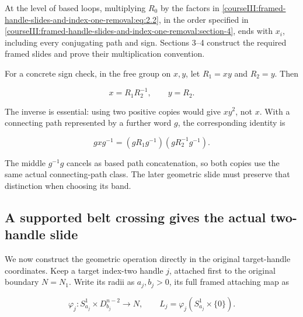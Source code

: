 At the level of based loops, multiplying \(R_0\) by the factors in \eqref{courseIII:framed-handle-slides-and-index-one-removal:eq:2.2}, in the order specified in \cref{courseIII:framed-handle-slides-and-index-one-removal:section-4}, ends with \(x_i\), including every conjugating path and sign. Sections 3--4 construct the required framed slides and prove their multiplication convention.

For a concrete sign check, in the free group on \(x,y\), let \(R_1=xy\) and \(R_2=y\). Then

\begin{equation}
x=R_1R_2^{-1},\qquad y=R_2.
 \label{courseIII:framed-handle-slides-and-index-one-removal:eq:2.3}
\end{equation}

The inverse is essential: using two positive copies would give \(xy^2\), not \(x\). With a connecting path represented by a further word \(g\), the corresponding identity is

\begin{equation}
gxg^{-1}=(gR_1g^{-1})(gR_2^{-1}g^{-1}).
 \label{courseIII:framed-handle-slides-and-index-one-removal:eq:2.4}
\end{equation}

The middle \(g^{-1}g\) cancels as based path concatenation, so both copies use the same actual connecting-path class. The later geometric slide must preserve that distinction when choosing its band.

\subsection{A supported belt crossing gives the actual two-handle slide}
\label{courseIII:framed-handle-slides-and-index-one-removal:slide-belt-crossing}

\label{courseIII:framed-handle-slides-and-index-one-removal:section-3}\label{courseIII:low-index-slides:3}

We now construct the geometric operation directly in the original target-handle coordinates. Keep a target index-two handle \(j\), attached first to the original boundary \(N=N_1\). Write its radii as \(a_j,b_j>0\), its full framed attaching map as

\begin{equation}
\varphi_j:S^1_{a_j}\times D^{n-2}_{b_j}\longrightarrow N,
 \qquad L_j=\varphi_j(S^1_{a_j}\times\{0\}).
 \label{courseIII:framed-handle-slides-and-index-one-removal:eq:3.1}
\end{equation}

